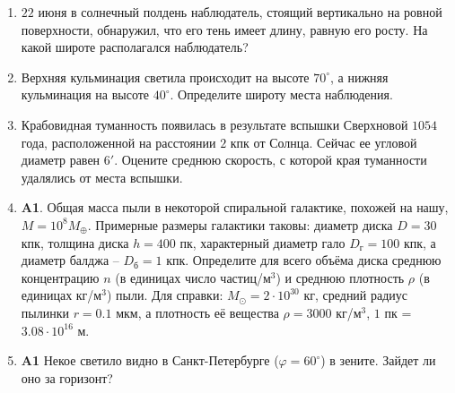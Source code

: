 \documentclass[11pt]{article}
\begin{document}
\begin{enumerate}[label=\textbf{C\arabic*.}]
	\item $22$ июня в солнечный полдень наблюдатель, стоящий вертикально на ровной поверхности, обнаружил, что его тень имеет длину, равную его росту. На какой широте располагался наблюдатель? %
    \item Верхняя кульминация светила происходит на высоте $70^{\circ}$, а нижняя кульминация на высоте $40^{\circ}$. Определите широту места наблюдения. %
    \item Крабовидная туманность появилась в результате вспышки Сверхновой $1054$ года, расположенной на расстоянии $2$ кпк от Солнца. Сейчас ее угловой диаметр равен $6'$. Оцените среднюю скорость, с которой края туманности удалялись от места вспышки. %
    \item\textbf{A1}. Общая масса пыли в некоторой спиральной галактике, похожей на нашу, $M = 10^8M_{\oplus}$. Примерные размеры галактики таковы: диаметр диска $D = 30$ кпк, толщина диска $h = 400$ пк, характерный диаметр гало $D_{\text{г}} = 100$ кпк, а диаметр
    балджа -- $D_{\text{б}} = 1$ кпк. Определите для всего объёма диска среднюю концентрацию $n$ (в единицах число частиц/м$^3$) и среднюю плотность $\rho$ (в единицах кг/м$^3$) пыли. Для справки: $M_{\odot} = 2\cdot10^{30}$ кг, средний радиус пылинки $r = 0.1$ мкм, а
    плотность её вещества $\rho = 3 000$ кг/м$^3$, $1$ пк = $3.08\cdot10^{16}$ м. %
    \item\textbf{A1} Некое светило видно в Санкт-Петербурге ($\varphi = 60^{\circ}$) в зените. Зайдет ли оно за горизонт? %
\end{enumerate}
\end{document}
